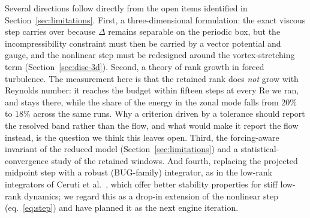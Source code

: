 Several directions follow directly from the open items identified in
Section~\ref{sec:limitations}. First, a three-dimensional formulation: the
exact viscous step carries over because $\Delta$ remains separable on the
periodic box, but the incompressibility constraint must then be carried by a
vector potential and gauge, and the nonlinear step must be redesigned around
the vortex-stretching term (Section~\ref{sec:disc-3d}). Second, a theory of
rank growth in forced turbulence. The measurement here is
that the retained rank does \emph{not} grow with Reynolds number: it reaches the budget within fifteen steps at every $\mathrm{Re}$ we
ran, and stays there, while the share of the energy in the zonal mode falls
from $20\%$ to $18\%$ across the same runs. Why a criterion driven by a
tolerance should report the resolved band rather than the flow, and what would
make it report the flow instead, is the question we think this leaves open.
Third, the forcing-aware invariant of the reduced model (Section~\ref{sec:limitations})
and a statistical-convergence study of the retained windows. And fourth,
replacing the projected midpoint step with a robust (BUG-family) integrator,
as in the low-rank integrators of Ceruti et al.~\cite{ceruti2024}, which
offer better stability properties for stiff low-rank dynamics; we regard this
as a drop-in extension of the nonlinear step (eq.~\ref{eq:step}) and have
planned it as the next engine iteration.
